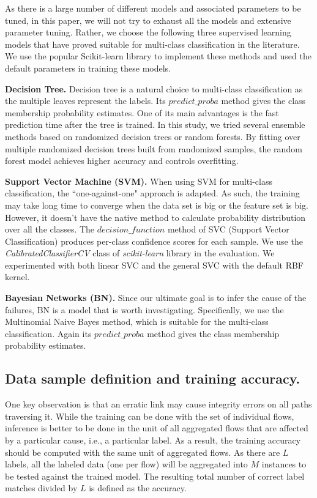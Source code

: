 As there is a large number of different models and associated parameters to be tuned, in this paper, we will not try to exhaust all the models and extensive parameter tuning. Rather, we choose the following three supervised learning models that have proved suitable for multi-class classification in the literature. We use the popular Scikit-learn library to implement these methods and used the default parameters in training these models. 

{\bf Decision Tree.}  Decision tree is a natural choice to multi-class classification as the multiple leaves represent the labels. Its $predict\_proba$ method gives the class membership probability estimates. One of its main advantages is the fast prediction time after the tree is trained. In this study, we tried several ensemble methods based on randomized decision trees or random forests. By fitting over multiple randomized decision trees built from randomized samples, the random forest model achieves higher accuracy and controls overfitting. 

{\bf Support Vector Machine (SVM).} When using SVM for multi-class classification, the ``one-against-one" approach is adapted. As such, the training may take long time to converge when the data set is big or the feature set is big. However, it doesn't have the native method to calculate probability distribution over all the classes. The $decision\_function$ method of SVC (Support Vector Classification) produces per-class confidence scores for each sample. We use the \emph{CalibratedClassifierCV} class of {\it scikit-learn} library in the evaluation. We experimented with both linear SVC and the general SVC with the default RBF kernel.

{\bf Bayesian Networks (BN).} Since our ultimate goal is to infer the cause of the failures, BN is a model that is worth investigating. Specifically, we use the Multinomial Naive Bayes method, which is suitable for the multi-class classification. Again its $predict\_proba$ method gives the class membership probability estimates.

\subsection{Data sample definition and training accuracy.}
One key observation is that an erratic link may cause integrity errors on all paths traversing it. While the training can be done with the set of individual flows, inference is better to be done in the unit of all aggregated flows that are affected by a particular cause, i.e., a particular label. As a result, the training accuracy should be computed with the same unit of aggregated flows. As there are $L$ labels, all the labeled data (one per flow) will be aggregated into $M$ instances to be tested against the trained model. The resulting total number of correct label matches divided by $L$ is defined as the accuracy.

